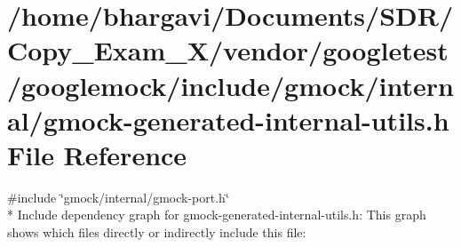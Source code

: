 \hypertarget{gmock-generated-internal-utils_8h}{}\section{/home/bhargavi/\+Documents/\+S\+D\+R/\+Copy\+\_\+\+Exam\+\_\+X/vendor/googletest/googlemock/include/gmock/internal/gmock-\/generated-\/internal-\/utils.h File Reference}
\label{gmock-generated-internal-utils_8h}
{\ttfamily \#include \char`\"{}gmock/internal/gmock-\/port.\+h\char`\"{}}\\*
Include dependency graph for gmock-\/generated-\/internal-\/utils.h\+:
This graph shows which files directly or indirectly include this file\+:
